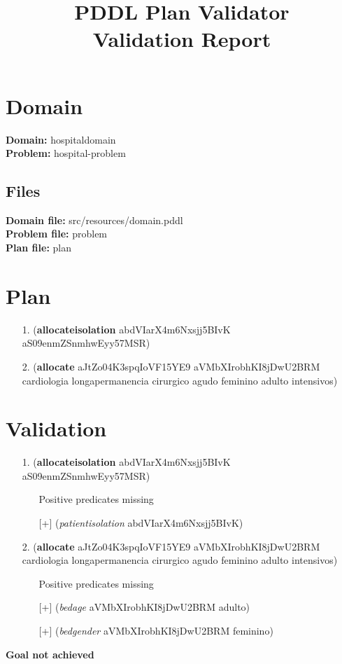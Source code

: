 \documentclass{article}
\title{\textbf{PDDL Plan Validator}\\Validation Report}
\date{} %
\begin{document}
\maketitle

\section{Domain}
\textbf{Domain:}  hospitaldomain\\
\textbf{Problem:} hospital-problem

\subsection{Files}
\textbf{Domain file:}  src/resources/domain.pddl \\
\textbf{Problem file:} problem\\
\textbf{Plan file:}    plan

\section{Plan}

\begin{itemize}
    \item[1.] (\textbf{allocateisolation} abdVIarX4m6Nxsjj5BIvK aS09enmZSnmhwEyy57MSR)
    \item[2.] (\textbf{allocate} aJtZo04K3spqIoVF15YE9 aVMbXIrobhKI8jDwU2BRM cardiologia longapermanencia cirurgico agudo feminino adulto intensivos)
\end{itemize}

\section{Validation}

\begin{itemize}
\item[1.] (\textbf{allocateisolation} abdVIarX4m6Nxsjj5BIvK aS09enmZSnmhwEyy57MSR)
\begin{itemize}
	\item[\textbullet] Positive predicates missing
	\item[\textbullet] [+] (\textit{patientisolation} abdVIarX4m6Nxsjj5BIvK)
\end{itemize}
\item[2.] (\textbf{allocate} aJtZo04K3spqIoVF15YE9 aVMbXIrobhKI8jDwU2BRM cardiologia longapermanencia cirurgico agudo feminino adulto intensivos)
\begin{itemize}
	\item[\textbullet] Positive predicates missing
	\item[\textbullet] [+] (\textit{bedage} aVMbXIrobhKI8jDwU2BRM adulto)
	\item[\textbullet] [+] (\textit{bedgender} aVMbXIrobhKI8jDwU2BRM feminino)
\end{itemize}
\end{itemize}

\hline
\vspace{10pt}
\large \textbf{Goal not achieved}
\end{document}
